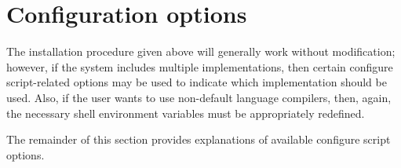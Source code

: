 
\section{Configuration options}

The installation procedure given above will generally work without modification;
however, if the system includes multiple {\mpi} implementations, then certain
configure script-related options may be used to indicate which {\mpi}
implementation should be used. Also, if the user wants to use non-default
language compilers, then, again, the necessary shell environment variables must
be appropriately redefined.

The remainder of this section provides explanations of available configure script
options.



